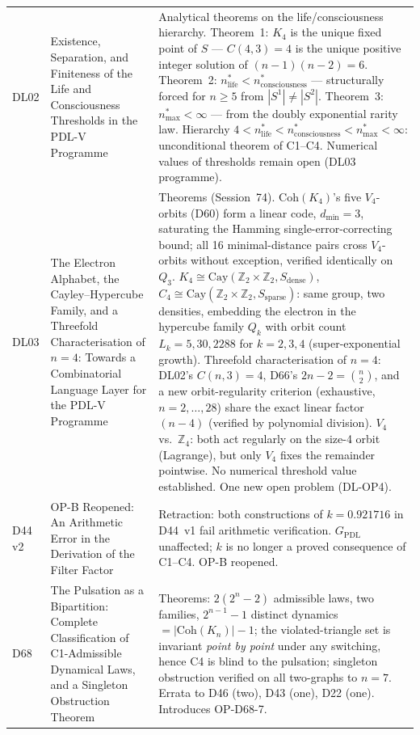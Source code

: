 \documentclass[11pt,a4paper]{article}
\theoremstyle{plain}
\theoremstyle{definition}
\theoremstyle{remark}
\begin{document}
\begin{longtable}{L{1.3cm}L{3.8cm}L{8.0cm}}
DL02 & Existence, Separation, and Finiteness of the Life and Consciousness Thresholds in the PDL-V Programme~\cite{DL02} & \textcolor{proofblue}{Analytical theorems} on the life/consciousness hierarchy. Theorem~1: $K_4$ is the unique fixed point of $S$ --- $C(4,3)=4$ is the unique positive integer solution of $(n-1)(n-2)=6$. Theorem~2: $n^*_{\mathrm{life}} < n^*_{\mathrm{consciousness}}$ --- structurally forced for $n \geq 5$ from $|S^1| \neq |S^2|$. Theorem~3: $n^*_{\mathrm{max}} < \infty$ --- from the doubly exponential rarity law. Hierarchy $4 < n^*_{\mathrm{life}} < n^*_{\mathrm{consciousness}} < n^*_{\mathrm{max}} < \infty$: unconditional theorem of C1--C4. Numerical values of thresholds remain open (DL03 programme).\\[0.4em]
DL03 & The Electron Alphabet, the Cayley--Hypercube Family, and a Threefold Characterisation of $n=4$: Towards a Combinatorial Language Layer for the PDL-V Programme~\cite{DL03} & \textcolor{proofblue}{Theorems} (Session~74). $\mathrm{Coh}(K_4)$'s five $V_4$-orbits (D60) form a linear code, $d_{\min}=3$, saturating the Hamming single-error-correcting bound; all 16 minimal-distance pairs cross $V_4$-orbits without exception, verified identically on $Q_3$. $K_4\cong\mathrm{Cay}(\mathbb{Z}_2\times\mathbb{Z}_2,S_{\mathrm{dense}})$, $C_4\cong\mathrm{Cay}(\mathbb{Z}_2\times\mathbb{Z}_2,S_{\mathrm{sparse}})$: same group, two densities, embedding the electron in the hypercube family $Q_k$ with orbit count $L_k=5,30,2288$ for $k=2,3,4$ (super-exponential growth). Threefold characterisation of $n=4$: DL02's $C(n,3)=4$, D66's $2n-2=\binom n2$, and a new orbit-regularity criterion (exhaustive, $n=2,\ldots,28$) share the exact linear factor $(n-4)$ (verified by polynomial division). $V_4$ vs.\ $\mathbb{Z}_4$: both act regularly on the size-4 orbit (Lagrange), but only $V_4$ fixes the remainder pointwise. No numerical threshold value established. One new open problem (DL-OP4).\\[0.4em]
D44\,v2 & OP-B Reopened: An Arithmetic Error in the Derivation of the Filter Factor~\cite{D44v2} & \textcolor{negativered}{Retraction}: both constructions of $k=0.921716$ in D44~v1 fail arithmetic verification. $G_{\mathrm{PDL}}$ unaffected; $k$ is no longer a proved consequence of C1--C4. \textcolor{openproblemred}{OP-B reopened.}\\[0.3em]
D68 & The Pulsation as a Bipartition: Complete Classification of C1-Admissible Dynamical Laws, and a Singleton Obstruction Theorem~\cite{D68} & \textcolor{proofblue}{Theorems}: $2(2^n-2)$ admissible laws, two families, $2^{n-1}-1$ distinct dynamics $=|\mathrm{Coh}(K_n)|-1$; the violated-triangle set is invariant \emph{point by point} under any switching, hence C4 is blind to the pulsation; singleton obstruction verified on all two-graphs to $n=7$. Errata to D46 (two), D43 (one), D22 (one). Introduces OP-D68-7.\\[0.3em]

\end{longtable}
\end{document}
